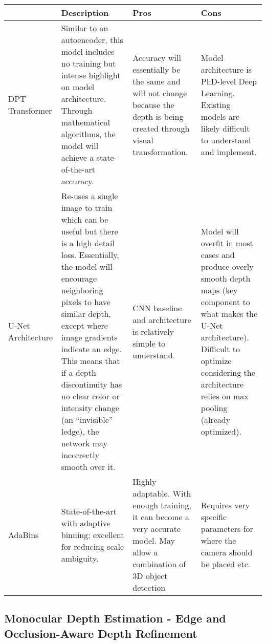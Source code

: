 \documentclass[document]{llncs}
\begin{document}
\begin{table}[H]
\hspace*{-1cm}
\label{tab:gripper_design}
\begin{tabular}{|l|p{5cm}|p{5cm}|p{5cm}|}
\hline
\textbf{} & \textbf{Description} & \textbf{Pros} & \textbf{Cons} \\
\hline
    DPT Transformer
& 
    Similar to an autoencoder, this model includes no training but intense highlight on model architecture. Through mathematical algorithms, the model will achieve a state-of-the-art accuracy.
& 
    Accuracy will essentially be the same and will not change because the depth is being created through visual transformation.
&
    Model architecture is PhD-level Deep Learning.
Existing models are likely difficult to understand and implement.

\\ 
\hline
    U-Net Architecture
& 
    Re-uses a single image to train which can be useful but there is a high detail loss. Essentially, the model will encourage neighboring pixels to have similar depth, except where image gradients indicate an edge. This means that if a depth discontinuity has no clear color or intensity change (an “invisible” ledge), the network may incorrectly smooth over it.
& 
    CNN baseline and architecture is relatively simple to understand.
&
    Model will overfit in most cases and produce overly smooth depth maps (key component to what makes the U-Net architecture).
    Difficult to optimize considering the architecture relies on max pooling (already optimized).
\\ 
\hline
    AdaBins
& 
    State-of-the-art with adaptive binning; excellent for reducing scale ambiguity.
&
    Highly adaptable.
    With enough training, it can become a very accurate model.
    May allow a combination of 3D object detection 
& 
    Requires very specific parameters for where the camera should be placed etc.
\\ 
\hline
\end{tabular}
\end{table}

\subsection{Monocular Depth Estimation - Edge and Occlusion-Aware Depth Refinement}
\end{document}
